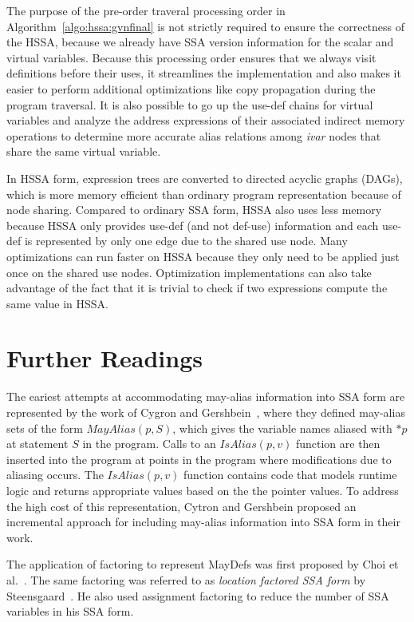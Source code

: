 The purpose of the pre-order traveral processing order in 
Algorithm~\ref{algo:hssa:gvnfinal} is not strictly required to ensure the
correctness of the HSSA, because we already have SSA version information for
the scalar and virtual variables.  Because this processing order ensures that
we always visit definitions before their uses, it streamlines the implementation
and also makes it easier to perform additional optimizations like copy
propagation during the program traversal.  It is also possible to go up the
use-def chains for virtual variables and analyze the address expressions of
their associated indirect memory operations to determine more accurate alias
relations among {\em ivar} nodes that share the same virtual variable.

In HSSA form, expression trees are converted to directed acyclic graphs
(DAGs), which is more memory efficient than ordinary program representation 
because of node sharing.  Compared to ordinary SSA form, HSSA also uses less
memory because HSSA only provides use-def (and not def-use) information and
each use-def is represented by only one edge due to the shared use node.
Many optimizations can run faster on HSSA because they only need to be applied
just once on the shared use nodes.  Optimization implementations can also take
advantage of the fact that it is trivial to check if two expressions compute
the same value in HSSA.


\section{Further Readings}
The eariest attempts at accommodating may-alias information into SSA form 
are represented by the work of Cygron and Gershbein~\cite{cytron:1993:mayalias},
where they defined may-alias sets of the form $MayAlias(p, S)$, which gives
the variable names aliased with $*p$ at statement $S$ in the program.  Calls
to an $IsAlias(p,v)$ function are then inserted into the program at points in 
the program where modifications due to aliasing occurs. The $IsAlias(p,v)$ 
function contains code that models runtime logic and returns 
appropriate values based on the the pointer values. 
To address the high cost of this representation, Cytron and Gershbein
proposed an incremental approach for including may-alias information into SSA 
form in their work.

The application of factoring to represent MayDefs was first proposed by
Choi {et al.}~\cite{CCF94}.  The same factoring was referred to as
\emph{location factored SSA form} by Steensgaard~\cite{Steen95}.  He also
used assignment factoring to reduce the number of SSA variables in his
SSA form.

